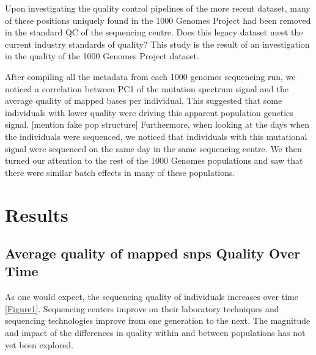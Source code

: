 \documentclass[12pt]{amsart}
\begin{document}
Upon investigating the quality control pipelines of the more recent dataset, many of these positions uniquely found in the 1000 Genomes Project had been removed in the standard QC of the sequencing centre. 
Does this legacy dataset meet the current industry standards of quality? 
This study is the result of an investigation in the quality of the 1000 Genomes Project dataset. 


After compiling all the metadata from each 1000 genomes sequencing run, we noticed a correlation between PC1 of the mutation spectrum signal and the average quality of mapped bases per individual. 
This suggested that some individuals with lower quality were driving this apparent population genetics signal. [mention fake pop structure]
Furthermore, when looking at the days when the individuals were sequenced, we noticed that individuals with this mutational signal were sequenced on the same day in the same sequencing centre.
We then turned our attention to the rest of the 1000 Genomes populations and saw that there were similar batch effects in many of these populations.

			\section{Results}
\subsection{Average quality of mapped snps Quality Over Time}
As one would expect, the sequencing quality of individuals increases over time \ref{Figure1}. Sequencing centers improve on their laboratory techniques and sequencing technologies improve from one generation to the next. The magnitude and impact of the differences in quality within and between populations has not yet been explored. 
\end{document}
